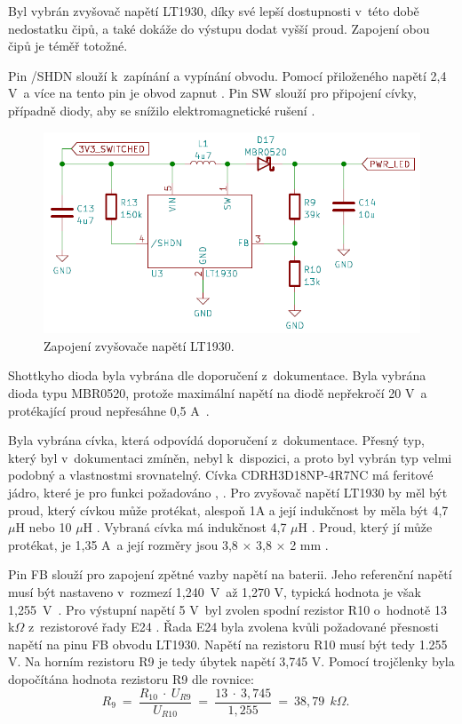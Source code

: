 Byl vybrán zvyšovač napětí LT1930, díky své lepší dostupnosti v~této době nedostatku čipů, a také dokáže do výstupu dodat vyšší proud. Zapojení obou čipů je téměř totožné. 

Pin /SHDN slouží k~zapínání a vypínání obvodu. Pomocí přiloženého napětí 2,4 V~a více na tento pin je obvod zapnut \cite{LT1930_dtsh}. Pin SW slouží pro  připojení cívky, 
případně diody, aby se snížilo elektromagnetické rušení \cite{LT1930_dtsh}. 

\begin{figure}[!h]
  \begin{center}
    \includegraphics[scale=0.6]{obrazky/LT1930.png}
  \end{center}
  \caption[Zapojení zvyšovače napětí LT1930]{Zapojení zvyšovače napětí LT1930.}
\end{figure}

Shottkyho dioda byla vybrána dle doporučení z~dokumentace. Byla vybrána dioda typu MBR0520, protože maximální napětí na diodě nepřekročí 20 V~a protékající proud nepřesáhne 
0,5 A~\cite{LT1930_dtsh}.

Byla vybrána cívka, která odpovídá doporučení z~dokumentace. Přesný typ, který byl v~dokumentaci zmíněn, nebyl k~dispozici, a proto byl vybrán typ velmi podobný a vlastnostmi 
srovnatelný. Cívka CDRH3D18NP-4R7NC má feritové jádro, které je pro funkci požadováno \cite{LT1930_dtsh}, \cite{civka_dtsh}. Pro zvyšovač napětí LT1930 by měl být proud, který cívkou může protékat, 
alespoň 1A a její indukčnost by měla být 4,7 $\mu$H nebo 10 $\mu$H \cite{LT1930_dtsh}. Vybraná cívka má indukčnost 4,7 $\mu$H \cite{civka_dtsh}. Proud, který jí může protékat, je 1,35 A~a její rozměry 
jsou 3,8 $\times$ 3,8 $\times$ 2 mm \cite{civka_dtsh}.

Pin FB slouží  pro zapojení zpětné vazby napětí na baterii. Jeho referenční napětí musí být nastaveno v~rozmezí 1,240~V~až 1,270 V, typická hodnota je však 1,255~V~\cite{LT1930_dtsh}. 
Pro výstupní napětí 5 V~byl zvolen spodní rezistor R10 o~hodnotě 13 k$\Omega$ z~rezistorové řady E24 \cite{rezistorova_rada}. Řada E24 byla zvolena kvůli požadované přesnosti
napětí na pinu FB obvodu LT1930. Napětí na rezistoru R10 musí být tedy 1.255 V. Na horním rezistoru R9 je tedy úbytek napětí 3,745 V. Pomocí trojčlenky byla dopočítána hodnota 
rezistoru R9 dle rovnice:
\begin{equation} 
  R_{9}~=~\frac{R_{10}~\cdot~U_{R9}}{U_{R10}}~=~\frac{13~\cdot~3,745}{1,255}~=~38,79~\:k\Omega. 
  \quad
\label{eq:R9}
\end{equation}

